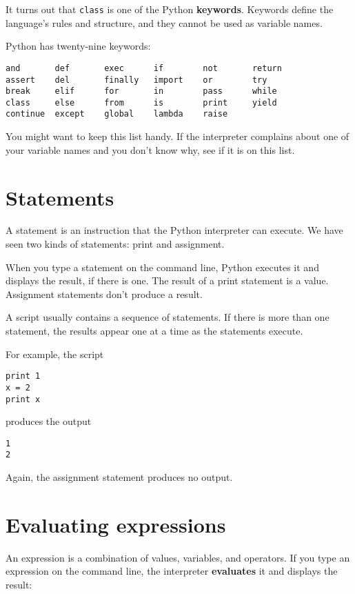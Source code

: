 It turns out that {\tt class} is one of the Python {\bf keywords}.
Keywords define the language's rules and structure, and they cannot be
used as variable names.


Python has twenty-nine keywords:

\beforeverb
\begin{verbatim}
and       def       exec      if        not       return
assert    del       finally   import    or        try
break     elif      for       in        pass      while
class     else      from      is        print     yield
continue  except    global    lambda    raise
\end{verbatim}
\afterverb
%
You might want to keep this list handy.  If the interpreter complains
about one of your variable names and you don't know why, see if it
is on this list.


\section{Statements}

A statement is an instruction that the Python interpreter can
execute.  We have seen two kinds of statements: print
and assignment.

When you type a statement on the command line, Python
executes it and displays the result, if there is one.  The
result of a print statement is a value.  Assignment statements
don't produce a result.

A script usually contains a sequence of statements.  If there
is more than one statement, the results appear one at a time
as the statements execute.

For example, the script

\beforeverb
\begin{verbatim}
print 1
x = 2
print x
\end{verbatim}
\afterverb
%
produces the output

\beforeverb
\begin{verbatim}
1
2
\end{verbatim}
\afterverb
%
Again, the assignment statement produces no output.



\section{Evaluating expressions}

An expression is a combination of values, variables, and operators.
If you type an expression on the command line, the interpreter
{\bf evaluates} it and displays the result:

